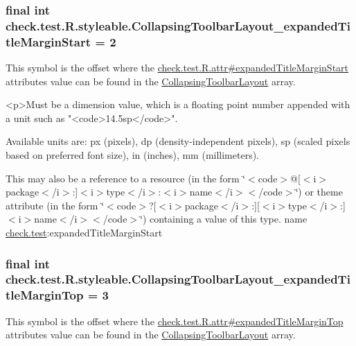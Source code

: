 \subsubsection[{Collapsing\+Toolbar\+Layout\+\_\+expanded\+Title\+Margin\+Start}]{\setlength{\rightskip}{0pt plus 5cm}final int check.\+test.\+R.\+styleable.\+Collapsing\+Toolbar\+Layout\+\_\+expanded\+Title\+Margin\+Start = 2\hspace{0.3cm}{\ttfamily [static]}}\label{classcheck_1_1test_1_1_r_1_1styleable_a9998f98d1bc4ccd614b3102b27346107}
This symbol is the offset where the \hyperlink{classcheck_1_1test_1_1_r_1_1attr_a9e33e552c74573d94aec9c48307e0e40}{check.\+test.\+R.\+attr\#expanded\+Title\+Margin\+Start} attribute\textquotesingle{}s value can be found in the \hyperlink{classcheck_1_1test_1_1_r_1_1styleable_a0c512120c75d0ddac20063034a72db17}{Collapsing\+Toolbar\+Layout} array.

\begin{DoxyVerb}      <p>Must be a dimension value, which is a floating point number appended with a unit such as "<code>14.5sp</code>".
\end{DoxyVerb}
 Available units are\+: px (pixels), dp (density-\/independent pixels), sp (scaled pixels based on preferred font size), in (inches), mm (millimeters). 

This may also be a reference to a resource (in the form \char`\"{}$<$code$>$@\mbox{[}$<$i$>$package$<$/i$>$\+:\mbox{]}$<$i$>$type$<$/i$>$\+:$<$i$>$name$<$/i$>$$<$/code$>$\char`\"{}) or theme attribute (in the form \char`\"{}$<$code$>$?\mbox{[}$<$i$>$package$<$/i$>$\+:\mbox{]}\mbox{[}$<$i$>$type$<$/i$>$\+:\mbox{]}$<$i$>$name$<$/i$>$$<$/code$>$\char`\"{}) containing a value of this type.  name \hyperlink{namespacecheck_1_1test}{check.\+test}\+:expanded\+Title\+Margin\+Start \hypertarget{classcheck_1_1test_1_1_r_1_1styleable_a33f7e13e75737dc7d53feb23164abfcf}{}
\subsubsection[{Collapsing\+Toolbar\+Layout\+\_\+expanded\+Title\+Margin\+Top}]{\setlength{\rightskip}{0pt plus 5cm}final int check.\+test.\+R.\+styleable.\+Collapsing\+Toolbar\+Layout\+\_\+expanded\+Title\+Margin\+Top = 3\hspace{0.3cm}{\ttfamily [static]}}\label{classcheck_1_1test_1_1_r_1_1styleable_a33f7e13e75737dc7d53feb23164abfcf}
This symbol is the offset where the \hyperlink{classcheck_1_1test_1_1_r_1_1attr_a81b637fdbd35044aace13d435adf27e1}{check.\+test.\+R.\+attr\#expanded\+Title\+Margin\+Top} attribute\textquotesingle{}s value can be found in the \hyperlink{classcheck_1_1test_1_1_r_1_1styleable_a0c512120c75d0ddac20063034a72db17}{Collapsing\+Toolbar\+Layout} array.

